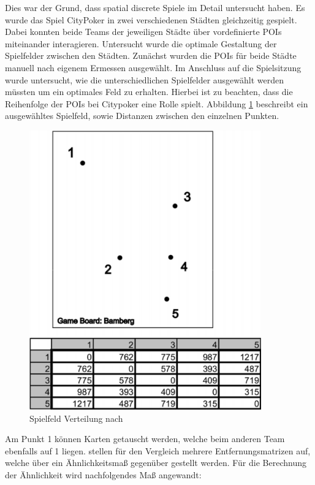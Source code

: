 Dies war der Grund, dass \textcite{Kiefer.2005b} spatial discrete Spiele im Detail untersucht haben.
Es wurde das Spiel CityPoker\cite{Kiefer.2005b} in zwei verschiedenen Städten gleichzeitig gespielt. Dabei konnten beide Teams der jeweiligen Städte über vordefinierte POIs miteinander interagieren. Untersucht wurde die optimale Gestaltung der Spielfelder zwischen den Städten. Zunächst wurden die POIs für beide Städte manuell nach eigenem Ermessen ausgewählt. Im Anschluss auf die Spielsitzung wurde untersucht, wie die unterschiedlichen Spielfelder ausgewählt werden müssten um ein optimales Feld zu erhalten. Hierbei ist zu beachten, dass die Reihenfolge der POIs bei Citypoker eine Rolle spielt.
Abbildung \ref{img:ch3_img03b_distributed} beschreibt ein ausgewähltes Spielfeld, sowie Distanzen zwischen den einzelnen Punkten.

\begin{figure}[H]
\begin{center}
\includegraphics[width=100mm]{images/ch3_img03b_distributed.png}
\caption{Spielfeld Verteilung nach \textcite{Kiefer.2007}}
\label{img:ch3_img03b_distributed}
\end{center}
\end{figure}

Am Punkt 1 können Karten getauscht werden, welche beim anderen Team ebenfalls auf 1 liegen. \textcite{Kiefer.2007} stellen für den Vergleich  mehrere Entfernungsmatrizen auf, welche über ein Ähnlichkeitsmaß gegenüber gestellt werden.
Für die Berechnung der Ähnlichkeit wird nachfolgendes Maß angewandt:

